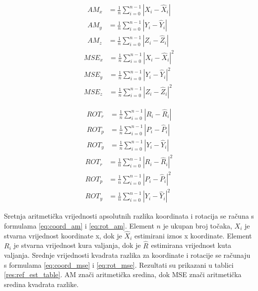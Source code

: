 \begin{equation}
  \begin{aligned}
AM_{x} &= \frac{1}{n}\sum_{i=0}^{n-1} |X_{i} - \hat{X}_{i}|\\
AM_{y} &= \frac{1}{n}\sum_{i=0}^{n-1} |Y_{i} - \hat{Y}_{i}|\\
AM_{z} &= \frac{1}{n}\sum_{i=0}^{n-1} |Z_{i} - \hat{Z}_{i}|
  \end{aligned}
  \label{eq:coord_am}
\end{equation}
\begin{equation}
  \begin{aligned}
MSE_{x} &= \frac{1}{n}\sum_{i=0}^{n-1} |X_{i} - \hat{X}_{i}|^2\\
MSE_{y} &= \frac{1}{n}\sum_{i=0}^{n-1} |Y_{i} - \hat{Y}_{i}|^2\\
MSE_{z} &= \frac{1}{n}\sum_{i=0}^{n-1} |Z_{i} - \hat{Z}_{i}|^2
  \end{aligned}
  \label{eq:coord_mse}
\end{equation}

\begin{equation}
  \begin{aligned}
ROT_{r} &= \frac{1}{n}\sum_{i=0}^{n-1} |R_{i} - \hat{R}_{i}|\\
ROT_{p} &= \frac{1}{n}\sum_{i=0}^{n-1} |P_{i} - \hat{P}_{i}|\\
ROT_{y} &= \frac{1}{n}\sum_{i=0}^{n-1} |Y_{i} - \hat{Y}_{i}|
  \end{aligned}
  \label{eq:rot_am}
\end{equation}
\begin{equation}
  \begin{aligned}
ROT_{r} &= \frac{1}{n}\sum_{i=0}^{n-1} |R_{i} - \hat{R}_{i}|^2\\
ROT_{p} &= \frac{1}{n}\sum_{i=0}^{n-1} |P_{i} - \hat{P}_{i}|^2\\
ROT_{y} &= \frac{1}{n}\sum_{i=0}^{n-1} |Y_{i} - \hat{Y}_{i}|^2
  \end{aligned}
  \label{eq:rot_mse}
\end{equation}

Sretnja aritmetička vrijednosti apsolutnih razlika koordinata i rotacija se računa s formulama \ref{eq:coord_am} i \ref{eq:rot_am}. Element $n$ je ukupan broj točaka, $X_{i}$ je stvarna vrijednost koordinate x, dok je $\hat{X}_{i}$ estimirani iznos x koordinate. Element $R_{i}$ je stvarna vrijednost kura valjanja, dok je $\hat{R}_{}$ estimirana vrijednost kuta valjanja. Srednje vrijednosti kvadrata razlika za koordinate i rotacije se računaju s formulama \ref{eq:coord_mse} i \ref{eq:rot_mse}. Rezultati su prikazani u tablici \ref{res:ref_est_table}. AM znači aritmetička sredina, dok MSE znači aritmetička sredina kvadrata razlike.

